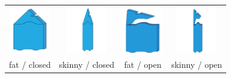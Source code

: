 \documentclass[man]{apa2}
\begin{document}
\begin{table} [h]
\begin{center}
\begin{tabular}{ccc|c}
                   \parbox[c]{5em}{\includegraphics[width=0.7in]{figures/appendixPix/shape7_b.png}} & \parbox[c]{5em}{\includegraphics[width=0.7in]{figures/appendixPix/shape7_d.png}} & \parbox[c]{5em}{\includegraphics[width=0.7in]{figures/appendixPix/shape7_c.png}} & \parbox[c]{5em}{\includegraphics[width=0.7in]{figures/appendixPix/shape7_a.png}}\\
       fat / closed   & skinny / closed & fat / open & skinny / open \\
               \hline 
               
               
               

\end{tabular}
\end{center}
\end{table}
\end{document}
